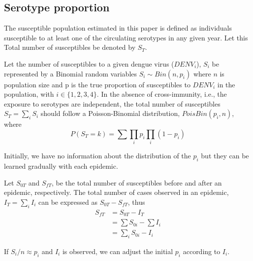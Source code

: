\subsection*{Serotype proportion}
The susceptible population estimated in this paper is defined as individuals 
susceptible to at least one of the circulating serotypes in any given year. 
Let this Total number of susceptibles be denoted by $S_T$. 

Let the number of susceptibles to a given dengue virus ($DENV_i$), $S_i$ be 
represented by a Binomial random variables $S_i \sim Bin(n, p_i)$ where $n$ is 
population size and p is the true proportion of susceptibles to $DENV_i$ in 
the population, with $i \in  \{1, 2, 3, 4\}$. In the absence of 
cross-immunity, i.e., the exposure to serotypes are independent, the 
total number of susceptibles $S_T=\sum_i S_i$  should follow a Poisson-Binomial 
distribution, $PoisBin(p_i,n)$, where
\begin{equation}
 P(S_T=k) = \sum \prod_i p_i \prod_i  (1-p_i)
\end{equation}

Initially, we have no information about the distribution of the $p_i$ but they 
can be learned gradually with each epidemic.

Let $S_{0T}$ and $S_{fT}$, be the total number of susceptibles before and 
after an epidemic, respectively. The total number of cases observed in an 
epidemic, $I_T = \sum_i I_i$ can be expressed as $S_{0T}-S_{fT}$, thus
\begin{align}
 S_{fT} &= S_{0T} - I_T\\
 &=\sum S_{0i} - \sum I_i\\
 &=\sum_i S_{0i}-I_i
\end{align}

If $S_i/n \approx p_i$ and $I_i$ is observed, we can adjust the initial 
$p_i$ according to $I_i$.








